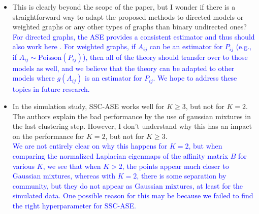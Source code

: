 \documentclass[
]{article}
\begin{document}
\begin{itemize}
{  SSC-ASE does rely on the latent configuration, but we show that the orthogonality property holds for the particular embedding we perform for this algorithm. 
  }\\
  \textcolor{blue}{
  That said, looking back at the latent configuration in Theorem 1, we can see that a $K$-dimensional (not $K^2$-dimensional) latent configuration is sufficient for clustering. 
  If we are able to obtain this exact embedding, this would greatly reduce the number of dimensions required for the embedding. 
  In practice, this isn't always possible due to the nonidentifiability issue (in particular, determining which of the $K$ out of $K^2$ eigenvectors should be used, although we have found via numerical experiments that community detection is often possible with the $2^{nd}$ to the $(K+1)^{st}$ embedding dimensions).
  }
\item
  This is clearly beyond the scope of the paper, but I wonder if there
  is a straightforward way to adapt the proposed methods to directed
  models or weighted graphs or any other types of graphs than binary
  undirected ones?\\
  \textcolor{blue}{
  For directed graphs, the ASE provides a consistent estimator and thus should also work here \citep{doi:10.1080/01621459.2012.699795}. 
  For weighted graphs, if $A_{ij}$ can be an estimator for $P_{ij}$ (e.g., if $A_{ij} \sim \mathrm{Poisson}(P_{ij})$), then all of the theory should transfer over to those models as well, 
  and we believe that the theory can be adapted to other models where $g(A_{ij})$ is an estimator for $P_{ij}$. 
  We hope to address these topics in future research. 
  }
\item
  In the simulation study, SSC-ASE works well for \(K \geq 3\), but not
  for \(K = 2\). The authors explain the bad performance by the use of
  gaussian mixtures in the last clustering step. However, I don't
  understand why this has an impact on the performance for \(K = 2\),
  but not for \(K \geq 3\).\\
  \textcolor{blue}{
  We are not entirely clear on why this happens for $K = 2$, but when comparing the normalized Laplacian eigenmaps of the affinity matrix $B$ for various $K$, we see that when $K > 2$, the points appear much closer to Gaussian mixtures, whereas with $K = 2$, there is some separation by community, but they do not appear as Gaussian mixtures, at least for the simulated data. 
  One possible reason for this may be because we failed to find the right hyperparameter for SSC-ASE. 
  }\\

\end{itemize}
\end{document}
